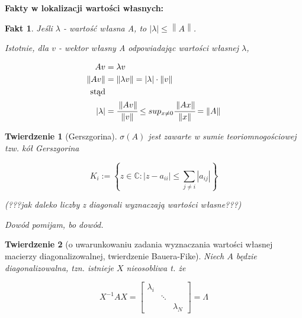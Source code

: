\documentclass[hidelinks,a4paper,fleqn,oneside]{book}
\newcommand{\CC}{\mathbb{C}}
\newcommand{\norm}[1]{\left\lVert#1\right\rVert}
\newtheorem{fakt}{Fakt}
\newtheorem{twierdz}{Twierdzenie}
\begin{document}
\textbf{Fakty w lokalizacji wartości własnych:}

\begin{fakt}
	Jeśli $\lambda$ - wartość własna A, to $|\lambda| \leq \norm{A}$.
		
	Istotnie, dla $v$ - wektor własny A odpowiadając wartości własnej $\lambda$,
		
	\begin{equation}
		\begin{aligned}
			Av             & =\lambda v                                                                                   \\
			\norm{A v}    & = \norm{\lambda v} = |\lambda| \cdot \norm{v}                                              \\
			\textrm{stąd} &                                                                                              \\
			|\lambda|      & = \cfrac{\norm{A v}}{\norm{v}} \leq sup_{x \neq 0} \cfrac{\norm{Ax}}{\norm{x}} = \norm{A} 
		\end{aligned}
	\end{equation}
		
\end{fakt}

\begin{twierdz}[Gerszgorina] $\sigma(A)$ jest zawarte w sumie teoriomnogościowej tzw. kół Gerszgorina
	
	\[
		K_{i} := \left\{ z \in \CC: |z - a_{ii} | \leq \sum_{j \neq i} |a_{ij}| \right\}
	\]
	
	(???jak daleko liczby z diagonali wyznaczają wartości własne???)
	
	
	Dowód pomijam, bo dowód.
	
\end{twierdz}

\begin{twierdz}[o uwarunkowaniu zadania wyznaczania wartości własnej macierzy diagonalizowalnej, twierdzenie Bauera-Fike]
	Niech $A$ będzie diagonalizowalna, tzn. istnieje $X$ nieosobliwa t. że
	
	\[
		X^{-1}AX = \left[ \begin{array}{ccc} \lambda_i & & \\ & \ddots \\ & & \lambda_N \end{array} \right] = \Lambda
	\]
\end{twierdz}
\end{document}
